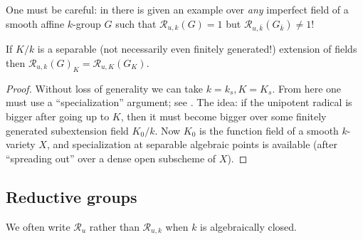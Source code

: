 \documentclass[10pt]{article}
\renewcommand{\(}{\left(}
\renewcommand{\)}{\right)}
\numberwithin{thm}{subsection}
\begin{document}
\begin{rem}\label{}
One must be careful: in \cite[Ex.\,1.1.3]{pred} 
there is given an example over {\em any} imperfect field of a smooth affine $k$-group $G$
such that $\mathscr{R}_{u,k}(G)=1$
but $\mathscr{R}_{u,\overline{k}}(G_{\overline{k}})\neq 1$!
\end{rem}
\begin{prop}\label{separablebasechangeforur}
If $K/k$ is a separable (not necessarily even finitely generated!)
extension of fields then $\mathscr{R}_{u,k}(G)_K=\mathscr{R}_{u,K}(G_K)$.
\end{prop}
\begin{proof}
Without loss of generality we can take $k=k_s,K=K_s$.
From here one must use a ``specialization'' argument; see \cite[Prop.\,1.1.9(1)]{pred}. 
The idea: if the unipotent radical is bigger after going up to $K$,
then it must become bigger over some finitely generated subextension field
$K_0/k$. Now $K_0$ is the function field of a smooth $k$-variety $X$,
and specialization at separable algebraic points is available (after ``spreading out'' over a dense open subscheme of $X$). 
\end{proof}
\subsection{Reductive groups}

We often write $\mathscr{R}_u$ rather than $\mathscr{R}_{u,k}$ when $k$ is algebraically closed.
\end{document}
